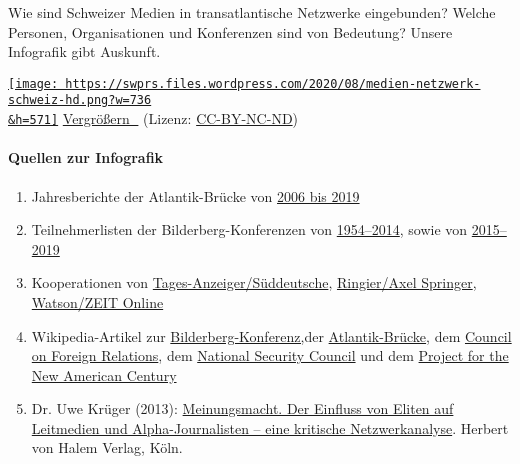 Wie sind Schweizer Medien in transatlantische Netzwerke eingebunden?
Welche Personen, Organisationen und Konferenzen sind von Bedeutung?
Unsere Infografik gibt Auskunft.

\href{https://swprs.files.wordpress.com/2020/08/medien-netzwerk-schweiz-hd.png}{\texttt{[image: https://swprs.files.wordpress.com/2020/08/medien-netzwerk-schweiz-hd.png?w=736\\\&h=571]}}
\href{https://swprs.files.wordpress.com/2020/08/medien-netzwerk-schweiz-hd.png}{Vergrößern
🔎} (Lizenz:
\href{https://creativecommons.org/licenses/by-nc-nd/4.0/deed.de}{CC-BY-NC-ND})

\hypertarget{quellen-zur-infografik}{%
\paragraph{Quellen zur Infografik}\label{quellen-zur-infografik}}

\begin{enumerate}
\def\labelenumi{\arabic{enumi}.}
\tightlist
\item
  Jahresberichte der Atlantik-Brücke von
  \href{https://www.atlantik-bruecke.org/unsere-arbeit/publikationen/jahresberichte/}{2006
  bis 2019}
\item
  Teilnehmerlisten der Bilderberg-Konferenzen von
  \href{https://swprs.files.wordpress.com/2016/07/bilderberg_teilnehmer_1954-2014.pdf}{1954--2014},
  sowie von
  \href{https://www.bilderbergmeetings.org/meetings/meetings-overview/index.html}{2015--2019}
\item
  Kooperationen von
  \href{https://www.tagesanzeiger.ch/schweiz/standard/In-eigener-Sache/story/24648194}{Tages-Anzeiger/Süddeutsche},
  \href{http://www.blick.ch/news/wirtschaft/medien-ringier-und-axel-springer-gruenden-gemeinschaftsunternehmen-in-der-schweiz-id3357037.html}{Ringier/Axel
  Springer},
  \href{https://www.persoenlich.com/medien/partnerschaft-mit-spiegel-online-beendet}{Watson/ZEIT
  Online}
\item
  Wikipedia-Artikel zur
  \href{https://de.wikipedia.org/wiki/Bilderberg-Konferenz}{Bilderberg-Konferenz,}der
  \href{https://de.wikipedia.org/wiki/Atlantik-Br\%C3\%BCcke}{Atlantik-Brücke},
  dem
  \href{https://en.wikipedia.org/wiki/Council_on_Foreign_Relations}{Council
  on Foreign Relations}, dem
  \href{https://de.wikipedia.org/wiki/United_States_National_Security_Council}{National
  Security Council} und dem
  \href{https://en.wikipedia.org/wiki/Project_for_the_New_American_Century}{Project
  for the New American Century}
\item
  Dr. Uwe Krüger (2013):
  \href{http://www.halem-verlag.de/meinungsmacht-und-elite-journalismus/}{Meinungsmacht.
  Der Einfluss von Eliten auf Leitmedien und Alpha-Journalisten -- eine
  kritische Netzwerkanalyse}. Herbert von Halem Verlag, Köln.
\end{enumerate}

